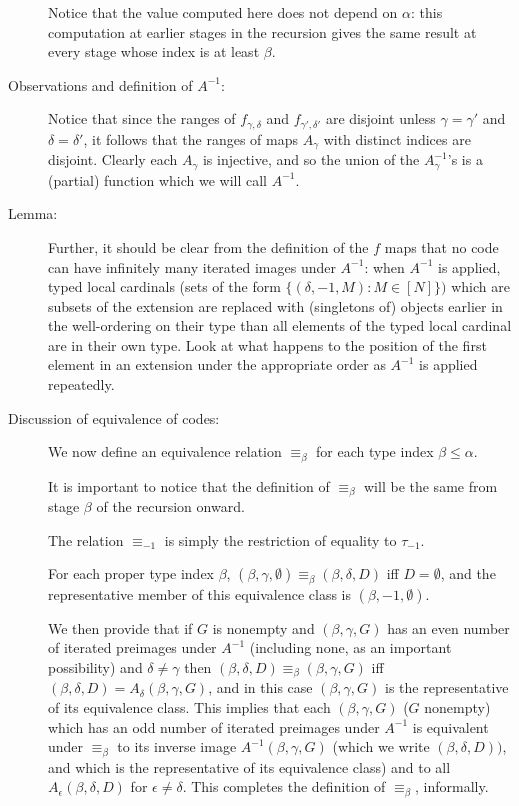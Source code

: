 \documentclass[112pt]{article}
\begin{document}
\begin{description}
Notice that the value computed here does not depend on $\alpha$:  this computation at earlier stages in the recursion gives the same result at every stage whose index is at least $\beta$.

\item[Observations and definition of $A^{-1}$:]  Notice that since the ranges of $f_{\gamma,\delta}$ and $f_{\gamma',\delta'}$ are disjoint unless $\gamma=\gamma'$ and $\delta=\delta'$, it follows that the ranges of
maps $A_\gamma$ with distinct indices are disjoint.  Clearly each $A_\gamma$ is injective, and so the union of the $A_\gamma^{-1}$'s is a (partial) function which we will call $A^{-1}$.

\item[Lemma:]  Further, it should be clear from the definition of the $f$ maps that
no code can have infinitely many iterated images under $A^{-1}$:  when $A^{-1}$ is applied, typed local cardinals (sets of the form $\{(\delta,-1,M):M\in [N]\})$ which are subsets of the extension are replaced with (singletons of) objects earlier in the well-ordering on their type than all elements of the typed local cardinal are in their own type.  Look at what happens to the position of the first element in an extension under the appropriate order as $A^{-1}$ is applied repeatedly.

\item[Discussion of equivalence of codes:]   We now define an equivalence relation $\equiv_{\beta}$ for each type index $\beta \leq \alpha$.

It is important to notice that the definition of $\equiv_{\beta}$ will be the same from stage $\beta$ of the recursion onward.

The relation $\equiv_{-1}$ is simply the restriction of equality to $\tau_{-1}$.

For each proper type index $\beta$, $(\beta,\gamma,\emptyset) \equiv_\beta (\beta,\delta,D)$ iff $D=\emptyset$, and the representative member of this equivalence class is $(\beta,-1,\emptyset)$.

We then provide that if $G$ is nonempty and $(\beta,\gamma,G)$ has an even number of iterated preimages under $A^{-1}$ (including none, as an important possibility) and $\delta \neq \gamma$ then $(\beta,\delta,D) \equiv_{\beta} (\beta,\gamma,G)$ iff  $(\beta,\delta,D)=A_\delta(\beta,\gamma,G)$, and in this case $(\beta,\gamma,G)$ is the representative of its equivalence class.
This implies that each $(\beta,\gamma,G)$ ($G$ nonempty) which has an odd number of iterated preimages under $A^{-1}$ is equivalent under $\equiv_\beta$ to
its inverse image $A^{-1}(\beta,\gamma,G)$ (which we write $(\beta,\delta,D))$, and which is the representative of its equivalence class) and to all $A_{\epsilon}(\beta,\delta,D)$ for
$\epsilon \neq \delta$.  This completes the definition of $\equiv_\beta$, informally.



\end{description}
\end{document}
